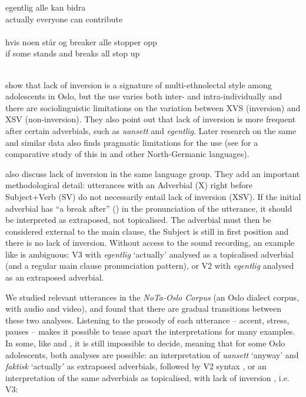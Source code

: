 \documentclass[output=paper,colorlinks,citecolor=brown,modfonts,nonflat]{../langscibook}
\begin{document}
\ea%
    \label{ex:emilsen:15}
\gll egentlig alle kan bidra \\
 actually everyone can contribute \\
   \\

\ex%
    \label{ex:emilsen:16}
\gll hvis noen står og breaker alle stopper opp \\
 if some stands and breaks all stop up \\
   \\
\z

\citet{OpsahlNistov2010} show that lack of inversion is a signature of multi-ethnolectal style among adolescents in Oslo, but the use varies both inter- and intra-individually and there are sociolinguistic limitations on the variation between XVS (inversion) and XSV (non-inversion). They also point out that lack of inversion is more frequent after certain adverbials, such as \textit{uansett} and \textit{egentlig}. Later research on the same and similar data also finds pragmatic limitations for the use (see \citealt{FreywaldEtAl2015} for a comparative study of this in  and other {North-Germanic} languages).

\citet{SvendsenRøyneland2008} also discuss lack of inversion in the same language group. They add an important methodological detail: utterances with an Adverbial (X) right before Subject+Verb (SV) do not necessarily entail lack of inversion (XSV). If the initial adverbial has “a break after” (\citealt[75]{SvendsenRøyneland2008}) in the pronunciation of the utterance, it should be interpreted as extraposed, not topicalised. The adverbial must then be considered external to the main clause, the Subject is still in first position and there is no lack of inversion. Without access to the sound recording, an example like  is ambiguous: V3 with \textit{egentlig} ‘actually’ analysed as a topicalised adverbial (and a regular main clause pronunciation pattern), or V2 with \textit{egentlig} analysed as an extraposed adverbial.

We studied relevant utterances in the \textit{NoTa-Oslo Corpus} (an Oslo dialect corpus, with audio and video), and found that there are gradual transitions between these two analyses. Listening to the prosody of each utterance – accent, stress, pauses – makes it possible to tease apart the interpretations for many examples. In some, like  and , it is still impossible to decide, meaning that for some Oslo adolescents, both analyses are possible: an interpretation of \textit{uansett} ‘anyway’ and \textit{faktisk} ‘actually’ as extraposed adverbials, followed by V2 syntax , or an interpretation of the same adverbials as topicalised, with lack of inversion , i.e. V3:
\end{document}
